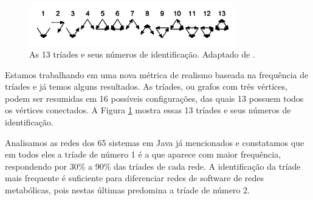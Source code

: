 \documentclass[12pt]{article}
\begin{document}
\begin{figure}[t]
\centering
\includegraphics[width=0.8\textwidth]{triades} 
\caption{As 13 tríades e seus números de identificação. Adaptado de 
\cite{Milo2002}.} 
\label{fig:triades} 
\end{figure}

Estamos trabalhando em uma nova métrica de realismo baseada na frequência de
tríades e já temos alguns resultados. As tríades, ou grafos com três vértices,
podem ser resumidas em 16 possíveis configurações, das quais 13 possuem todos
os vértices conectados. A Figura \ref{fig:triades} mostra essas 13 tríades e
seus números de identificação.

Analisamos as redes dos 65 sistemas em Java já mencionados e constatamos que em
todos eles a tríade de número 1 é a que aparece com maior frequência,
respondendo por 30\% a 90\% das tríades de cada rede. A identificação da tríade
mais frequente é suficiente para diferenciar redes de software de redes
metabólicas, pois nestas últimas predomina a tríade de número 2.

\renewcommand{\refname}{Referências Bibliográficas} 

\end{document}
